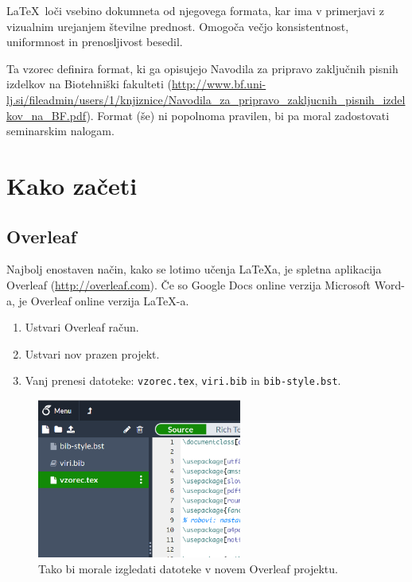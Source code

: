 \documentclass[a4paper, 12pt]{report}
\begin{document}
\LaTeX\ loči vsebino dokumneta od njegovega formata, kar ima v primerjavi z vizualnim urejanjem številne prednost.
Omogoča večjo konsistentnost, uniformnost in prenosljivost besedil. 

Ta vzorec definira format, ki ga opisujejo Navodila za pripravo zaključnih pisnih izdelkov na Biotehniški fakulteti (\url{http://www.bf.uni-lj.si/fileadmin/users/1/knjiznice/Navodila_za_pripravo_zakljucnih_pisnih_izdelkov_na_BF.pdf}). Format (še) ni popolnoma pravilen, bi pa moral zadostovati seminarskim nalogam.

\chapter{Kako začeti}

\section{Overleaf}

Najbolj enostaven način, kako se lotimo učenja \LaTeX a, je spletna aplikacija Overleaf (\url{http://overleaf.com}). Če so Google Docs online verzija Microsoft Word-a, je Overleaf online verzija \LaTeX-a.

\begin{enumerate}
  \item Ustvari Overleaf račun.
  \item Ustvari nov prazen projekt.
  \item Vanj prenesi datoteke: \texttt{vzorec.tex}, \texttt{viri.bib} in \texttt{bib-style.bst}.
\end{enumerate}

\begin{figure}[h]
\begin{center}
\includegraphics[width=0.6\textwidth]{images/overleaf-sidebar.png}
\end{center}
\caption{Tako bi morale izgledati datoteke v novem Overleaf projektu.}
\label{pic1}
\end{figure}
\end{document}
